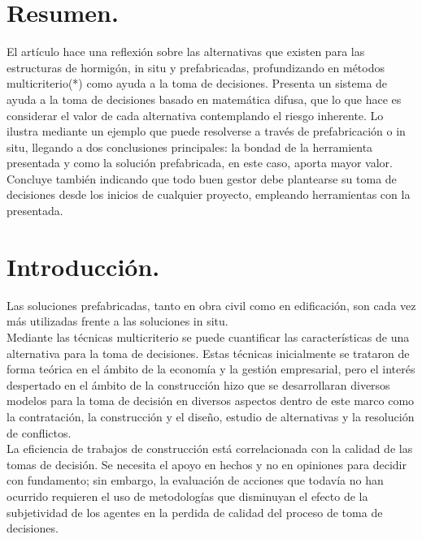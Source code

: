 \documentclass[10pt]{article}
\begin{document}
\newpage																		

\tableofcontents 

\newpage

\section{Resumen.}



El artículo hace una reflexión sobre las alternativas que existen para las estructuras de hormigón, in situ y prefabricadas, profundizando en métodos multicriterio(*) como ayuda a la toma de decisiones. Presenta un sistema de ayuda a la toma de decisiones basado en matemática difusa, que lo que hace es considerar el valor de cada alternativa contemplando el riesgo inherente. Lo ilustra mediante un ejemplo que puede resolverse a través de prefabricación  o in situ, llegando a dos conclusiones principales: la bondad de la herramienta presentada y como la solución prefabricada, en este caso, aporta mayor valor. Concluye también indicando que todo buen gestor debe plantearse su toma de decisiones desde los inicios de cualquier proyecto, empleando herramientas con la presentada.



\section{Introducción.} 

Las soluciones prefabricadas, tanto en obra civil como en edificación, son cada vez más utilizadas frente a las soluciones in situ.\\ 

Mediante las técnicas multicriterio se puede cuantificar las características de una alternativa para la toma de decisiones. Estas técnicas inicialmente se trataron de forma teórica en el ámbito de la economía y la gestión empresarial, pero el interés despertado en el ámbito de la construcción hizo que se desarrollaran diversos modelos  para la toma de decisión en diversos aspectos dentro de este marco como la contratación, la construcción y el diseño, estudio de alternativas y la resolución de conflictos. \\

La eficiencia de trabajos de construcción está correlacionada con la calidad de las tomas de decisión. Se necesita el apoyo en hechos y no en opiniones para decidir con fundamento; sin embargo, la evaluación de acciones que todavía no han ocurrido requieren el uso de metodologías que disminuyan el efecto de la subjetividad de los agentes en la perdida de calidad del proceso de toma de decisiones.\\
\end{document}
